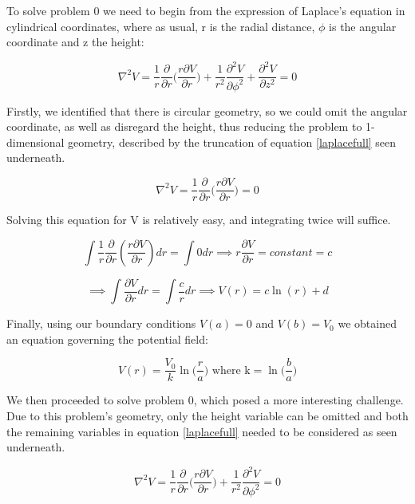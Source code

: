 \documentclass[a4paper]{article}
\begin{document}
To solve problem 0 we need to begin from the expression of Laplace's equation in cylindrical coordinates, where as usual, r is the radial distance, $\phi$ is the angular coordinate and z the height:

\begin{equation} \label{laplacefull}
\nabla^2V=\frac{1}{r}\frac{\partial}{\partial r}\Big( \frac{r\partial V}{\partial r} \Big) + \frac{1}{r^2}\frac{\partial^2V}{\partial\phi^2} + \frac{\partial^2V}{\partial z^2} = 0 
\end{equation} 

Firstly, we identified that there is circular geometry, so we could omit the angular coordinate, as well as disregard the height, thus reducing the problem to 1-dimensional geometry, described by the truncation of equation \ref{laplacefull} seen underneath.

\begin{equation}\nabla^2V=\frac{1}{r}\frac{\partial}{\partial r}\Big( \frac{r\partial V}{\partial r} \Big) = 0\end{equation}

Solving this equation for V is relatively easy, and integrating twice will suffice.

\begin{equation}\int\frac{1}{r}\frac{\partial}{\partial r}( \frac{r\partial V}{\partial r} )dr = \int0dr \implies r\frac{\partial V}{\partial r} = constant = c\end{equation}

\begin{equation}\implies \int\frac{\partial V}{\partial r}dr = \int \frac{c}{r} dr \implies V(r) = c\ln(r) + d \end{equation}

Finally, using our boundary conditions $ V(a) = 0$ and $V(b) = V_0$ we obtained an equation governing the potential field:

\begin{equation}\boxed{V(r) = \frac{V_0}{k}\ln\Big(\frac{r}{a}\Big) \textrm{ where k} = \ln\Big(\frac{b}{a}\Big) }\end{equation}

We then proceeded to solve problem 0, which posed a more interesting challenge. Due to this problem's geometry, only the height variable can be omitted and both the remaining variables in equation \ref{laplacefull} needed to be considered as seen underneath. 

\begin{equation}\nabla^2V=\frac{1}{r}\frac{\partial}{\partial r}\Big( \frac{r\partial V}{\partial r} \Big) + \frac{1}{r^2}\frac{\partial^2V}{\partial\phi^2} = 0\end{equation}
\end{document}
